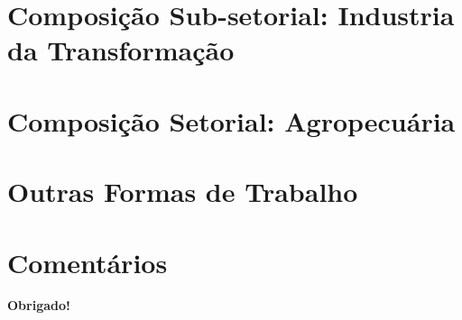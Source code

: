 \documentclass[11pt]{beamer}
\begin{document}


\section{Composição Sub-setorial: Industria da Transformação}



\section{Composição Setorial: Agropecuária}




\section{Outras Formas de Trabalho}



\section{Comentários}


\frame
{
    \begin{center}
     \vfill
    \textbf{Obrigado!}
     \\

     \vfill
\end{center}
}
\end{document}
